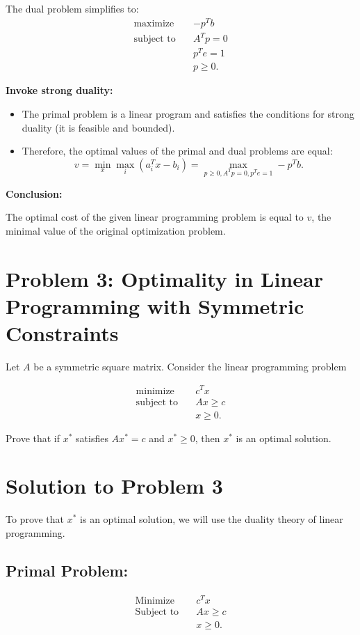 \documentclass{article}
\begin{document}
The dual problem simplifies to:
\[
\begin{aligned}
\text{maximize} \quad & -p^T b \\
\text{subject to} \quad & A^T p = 0 \\
& p^T e = 1 \\
& p \geq 0.
\end{aligned}
\]

\textbf{Invoke strong duality:}
\begin{itemize}
    \item The primal problem is a linear program and satisfies the conditions for strong duality (it is feasible and bounded).
    \item Therefore, the optimal values of the primal and dual problems are equal:
    \[
    v = \min_{x} \max_{i}(a_i^T x - b_i) = \max_{p \geq 0, A^T p = 0, p^T e = 1} -p^T b.
    \]
\end{itemize}

\textbf{Conclusion:}

The optimal cost of the given linear programming problem is equal to $v$, the minimal value of the original optimization problem.

\section*{Problem 3: Optimality in Linear Programming with Symmetric Constraints}

Let $A$ be a symmetric square matrix. Consider the linear programming problem

\begin{align*}
\text{minimize} \quad & c^T x \\
\text{subject to} \quad & Ax \geq c \\
& x \geq 0.
\end{align*}

Prove that if $x^*$ satisfies $Ax^* = c$ and $x^* \geq 0$, then $x^*$ is an optimal solution.

\section{Solution to Problem 3}

To prove that $x^*$ is an optimal solution, we will use the duality theory of linear programming.

\subsection{Primal Problem:}
\begin{align*}
\text{Minimize} \quad & c^T x \\
\text{Subject to} \quad & A x \geq c \\
& x \geq 0.
\end{align*}
\end{document}
